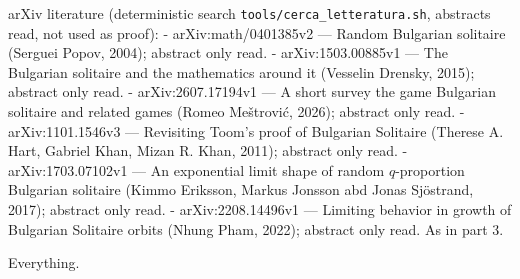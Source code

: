 arXiv literature (deterministic search
\texttt{tools/cerca\_letteratura.sh}, abstracts read, not used as
proof): - arXiv:math/0401385v2 --- Random Bulgarian solitaire (Serguei
Popov, 2004); abstract only read. - arXiv:1503.00885v1 --- The Bulgarian
solitaire and the mathematics around it (Vesselin Drensky, 2015);
abstract only read. - arXiv:2607.17194v1 --- A short survey the game
Bulgarian solitaire and related games (Romeo Meštrović, 2026); abstract
only read. - arXiv:1101.1546v3 --- Revisiting Toom's proof of Bulgarian
Solitaire (Therese A. Hart, Gabriel Khan, Mizan R. Khan, 2011); abstract
only read. - arXiv:1703.07102v1 --- An exponential limit shape of random
\(q\)-proportion Bulgarian solitaire (Kimmo Eriksson, Markus Jonsson abd
Jonas Sjöstrand, 2017); abstract only read. - arXiv:2208.14496v1 ---
Limiting behavior in growth of Bulgarian Solitaire orbits (Nhung Pham,
2022); abstract only read. As in part 3.


Everything.

